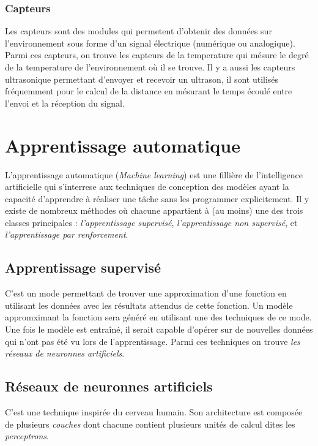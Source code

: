 \subsubsection{Capteurs}
Les capteurs sont des modules qui permetent d'obtenir des données sur
l'environnement sous forme d'un signal électrique (numérique ou analogique).
Parmi ces capteurs, on trouve les capteurs de la temperature qui mésure le degré
de la temperature de l'environnement où il se trouve. Il y a aussi les capteurs
ultrasonique permettant d'envoyer et recevoir un ultrason, il sont utilisés
fréquemment pour le calcul de la distance en mésurant le temps écoulé entre
l'envoi et la réception du signal.

\section{Apprentissage automatique}

L'apprentissage automatique (\emph{Machine learning}) est une fillière de
l'intelligence artificielle qui s'interrese aux techniques de conception des
modèles ayant la capacité d'apprendre à réaliser une tâche sans les programmer
explicitement. Il y existe de nombreux méthodes où chacune appartient à
(au moins) une des trois classes principales :
\emph{l'apprentissage supervisé}, \emph{l'apprentissage non supervisé}, et
\emph{l'apprentissage par renforcement}.

\subsection{Apprentissage supervisé}

C'est un mode permettant de trouver une approximation d'une fonction en utilisant
les données avec les résultats attendus de cette fonction. Un modèle appromximant
la fonction sera généré en utilisant une des techniques de ce mode. Une fois le
modèle est entraîné, il serait capable d'opérer sur de nouvelles données qui
n'ont pas été vu lors de l'apprentissage. Parmi ces techniques on trouve
\emph{les réseaux de neuronnes artificiels}.

\subsection{Réseaux de neuronnes artificiels}

C'est une technique inspirée du cerveau humain. Son architecture est composée de
plusieurs \emph{couches} dont chacune contient plusieurs unités de calcul dites
les \emph{perceptrons}.

